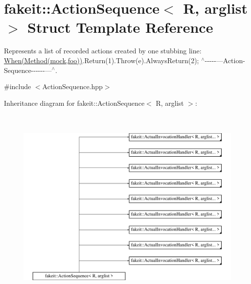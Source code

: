 \hypertarget{structfakeit_1_1ActionSequence}{}\section{fakeit\+::Action\+Sequence$<$ R, arglist $>$ Struct Template Reference}
\label{structfakeit_1_1ActionSequence}


Represents a list of recorded actions created by one stubbing line\+: \mbox{\hyperlink{single__header_2tpunit_2fakeit_8hpp_a665d1615d3ae3f21983056f052ab7f24}{When(\+Method(mock,foo))}}.Return(1).Throw(e).Always\+Return(2); $^\wedge$-\/-\/-\/-\/-\/---Action-\/\+Sequence-\/-\/-\/-\/-\/-\/---$^\wedge$.  




{\ttfamily \#include $<$Action\+Sequence.\+hpp$>$}

Inheritance diagram for fakeit\+::Action\+Sequence$<$ R, arglist $>$\+:\begin{figure}[H]
\begin{center}
\leavevmode
\includegraphics[height=9.929077cm]{structfakeit_1_1ActionSequence}
\end{center}
\end{figure}
